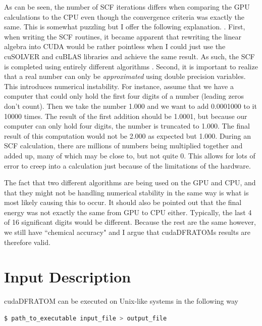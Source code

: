 As can be seen, the number of SCF iterations differs when comparing the GPU calculations to the CPU even though the convergence criteria was exactly the same. This is somewhat puzzling but I offer the following explanation. . First, when writing the SCF routines, it became apparent that rewriting the linear algebra into CUDA would be rather pointless when I could just use the cuSOLVER and cuBLAS libraries and achieve the same result. As such, the SCF is completed using entirely different algorithms  . Second, it is important to realize that a real number can only be \textit{approximated} using double precision variables. This introduces numerical instability. For instance, assume that we have a computer that could only hold the first four digits of a number (leading zeros don't count). Then we take the number 1.000 and we want to add 0.0001000 to it 10000 times. The result of the first addition should be 1.0001, but because our computer can only hold four digits, the number is truncated to 1.000. The final result of this computation would not be 2.000 as expected but 1.000. During an SCF calculation, there are millions of numbers being multiplied together and added up, many of which may be close to, but not quite 0. This allows for lots of error to creep into a calculation just because of the limitations of the hardware. 

The fact that two different algorithms are being used on the GPU and CPU, and that they might not be handling numerical stability in the same way is what is most likely causing this to occur. It should also be pointed out that the final energy was not exactly the same from GPU to CPU either. Typically, the last 4 of 16 significant digits would be different. Because the rest are the same however, we still have ``chemical accuracy"  and I argue that cudaDFRATOMs results are therefore valid.


\section{Input Description}\label{inp_des}
cudaDFRATOM can be executed on Unix-like systems in the following way
\begin{lstlisting}[language=bash]
	$ path_to_executable input_file > output_file
\end{lstlisting}

